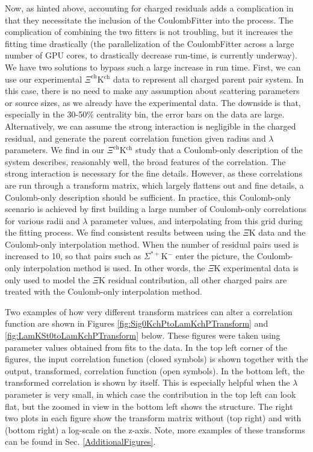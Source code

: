 \documentclass[../AnalysisNoteJBuxton.tex]{subfiles}
\begin{document}
Now, as hinted above, accounting for charged residuals adds a complication in that they necessitate the inclusion of the CoulombFitter into the process.  The complication of combining the two fitters is not troubling, but it increases the fitting time drastically (the parallelization of the CoulombFitter across a large number of GPU cores, to drastically decrease run-time, is currently underway).  We have two solutions to bypass such a large increase in run time.  First, we can use our experimental $\Xi^{\mathrm{ch}}$K$^{\mathrm{ch}}$ data to represent all charged parent pair system.  In this case, there is no need to make any assumption about scattering parameters or source sizes, as we already have the experimental data.  The downside is that, especially in the 30-50\% centrality bin, the error bars on the data are large.  Alternatively, we can assume the strong interaction is negligible in the charged residual, and generate the parent correlation function given radius and $\lambda$ parameters.  We find in our $\Xi^{\mathrm{ch}}$K$^{\mathrm{ch}}$ study that a Coulomb-only description of the system describes, reasonably well, the broad features of the correlation.  The strong interaction is necessary for the fine details.  However, as these correlations are run through a transform matrix, which largely flattens out and fine details, a Coulomb-only description should be sufficient.  In practice, this Coulomb-only scenario is achieved by first building a large number of Coulomb-only correlations for various radii and $\lambda$ parameter values, and interpolating from this grid during the fitting process.  We find consistent results between using the $\Xi$K data and the Coulomb-only interpolation method.  When the number of residual pairs used is increased to 10, so that pairs such as $\Sigma^{*+}$K$^{-}$ enter the picture, the Coulomb-only interpolation method is used.  In other words, the $\Xi$K experimental data is only used to model the $\Xi$K residual contribution, all other charged pairs are treated with the Coulomb-only interpolation method.

Two examples of how very different transform matrices can alter a correlation function are shown in Figures \ref{fig:Sig0KchPtoLamKchPTransform} and \ref{fig:LamKSt0toLamKchPTransform} below.  These figures were taken using parameter values obtained from fits to the data.  In the top left corner of the figures, the input correlation function (closed symbols) is shown together with the output, transformed, correlation function (open symbols).  In the bottom left, the transformed correlation is shown by itself.  This is especially helpful when the $\lambda$ parameter is very small, in which case the contribution in the top left can look flat, but the zoomed in view in the bottom left shows the structure.  The right two plots in each figure show the transform matrix without (top right) and with (bottom right) a log-scale on the z-axis.  Note, more examples of these transforms can be found in Sec. \ref{AdditionalFigures}.
\end{document}
